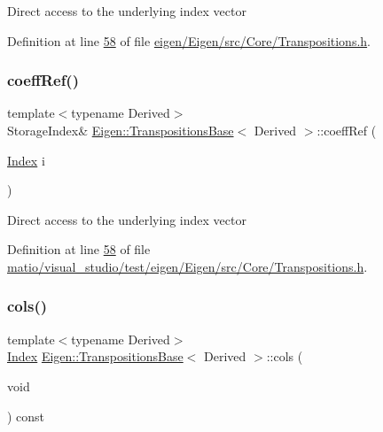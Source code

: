 Direct access to the underlying index vector 

Definition at line \hyperlink{eigen_2_eigen_2src_2_core_2_transpositions_8h_source_l00058}{58} of file \hyperlink{eigen_2_eigen_2src_2_core_2_transpositions_8h_source}{eigen/\+Eigen/src/\+Core/\+Transpositions.\+h}.

\mbox{\label{class_eigen_1_1_transpositions_base_a97dda1bb4ff8bdd83d8e97af3e590252}} 
\subsubsection{\texorpdfstring{coeff\+Ref()}{coeffRef()}\hspace{0.1cm}{\footnotesize\ttfamily [2/2]}}
{\footnotesize\ttfamily template$<$typename Derived$>$ \\
Storage\+Index\& \hyperlink{class_eigen_1_1_transpositions_base}{Eigen\+::\+Transpositions\+Base}$<$ Derived $>$\+::coeff\+Ref (\begin{DoxyParamCaption}\item[{\hyperlink{class_eigen_1_1_transpositions_base_a3f5f06118b419e8e6ccbe49ed5b4c91f}{Index}}]{i }\end{DoxyParamCaption})\hspace{0.3cm}{\ttfamily [inline]}}

Direct access to the underlying index vector 

Definition at line \hyperlink{matio_2visual__studio_2test_2eigen_2_eigen_2src_2_core_2_transpositions_8h_source_l00058}{58} of file \hyperlink{matio_2visual__studio_2test_2eigen_2_eigen_2src_2_core_2_transpositions_8h_source}{matio/visual\+\_\+studio/test/eigen/\+Eigen/src/\+Core/\+Transpositions.\+h}.

\mbox{\label{class_eigen_1_1_transpositions_base_acb6f58081640839bd4102b75bdeec562}} 
\subsubsection{\texorpdfstring{cols()}{cols()}\hspace{0.1cm}{\footnotesize\ttfamily [1/2]}}
{\footnotesize\ttfamily template$<$typename Derived$>$ \\
\hyperlink{class_eigen_1_1_transpositions_base_a3f5f06118b419e8e6ccbe49ed5b4c91f}{Index} \hyperlink{class_eigen_1_1_transpositions_base}{Eigen\+::\+Transpositions\+Base}$<$ Derived $>$\+::cols (\begin{DoxyParamCaption}\item[{void}]{ }\end{DoxyParamCaption}) const\hspace{0.3cm}{\ttfamily [inline]}}

